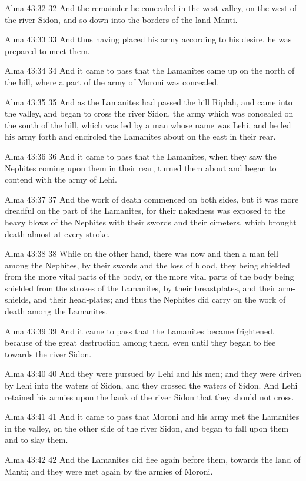 Alma 43:32
 32 And the remainder he concealed in the west valley, on the
west of the river Sidon, and so down into the borders of the land
Manti.

Alma 43:33
 33 And thus having placed his army according to his desire, he
was prepared to meet them.

Alma 43:34
 34 And it came to pass that the Lamanites came up on the north
of the hill, where a part of the army of Moroni was concealed.

Alma 43:35
 35 And as the Lamanites had passed the hill Riplah, and came
into the valley, and began to cross the river Sidon, the army
which was concealed on the south of the hill, which was led by a
man whose name was Lehi, and he led his army forth and encircled
the Lamanites about on the east in their rear.

Alma 43:36
 36 And it came to pass that the Lamanites, when they saw the
Nephites coming upon them in their rear, turned them about and
began to contend with the army of Lehi.

Alma 43:37
 37 And the work of death commenced on both sides, but it was
more dreadful on the part of the Lamanites, for their nakedness
was exposed to the heavy blows of the Nephites with their swords
and their cimeters, which brought death almost at every stroke.

Alma 43:38
 38 While on the other hand, there was now and then a man fell
among the Nephites, by their swords and the loss of blood, they
being shielded from the more vital parts of the body, or the more
vital parts of the body being shielded from the strokes of the
Lamanites, by their breastplates, and their arm-shields, and
their head-plates; and thus the Nephites did carry on the work of
death among the Lamanites.

Alma 43:39
 39 And it came to pass that the Lamanites became frightened,
because of the great destruction among them, even until they
began to flee towards the river Sidon.

Alma 43:40
 40 And they were pursued by Lehi and his men; and they were
driven by Lehi into the waters of Sidon, and they crossed the
waters of Sidon. And Lehi retained his armies upon the bank of
the river Sidon that they should not cross.

Alma 43:41
 41 And it came to pass that Moroni and his army met the
Lamanites in the valley, on the other side of the river Sidon,
and began to fall upon them and to slay them.

Alma 43:42
 42 And the Lamanites did flee again before them, towards the
land of Manti; and they were met again by the armies of Moroni.

